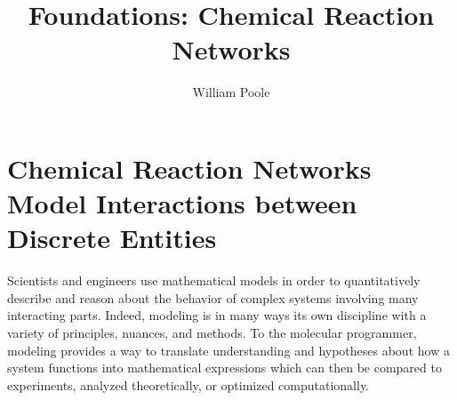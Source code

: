 
\title{Foundations: Chemical Reaction Networks}
\author{William Poole}

\maketitle
\label{sec:crn}
\section{Chemical Reaction Networks Model Interactions between Discrete Entities}

Scientists and engineers use mathematical models in order to quantitatively describe and reason about the behavior of complex systems involving many interacting parts. Indeed, modeling is in many ways its own discipline with a variety of principles, nuances, and methods. To the molecular programmer, modeling provides a way to translate understanding and hypotheses about how a system functions into mathematical expressions which can then be compared to experiments, analyzed theoretically, or optimized computationally. 

